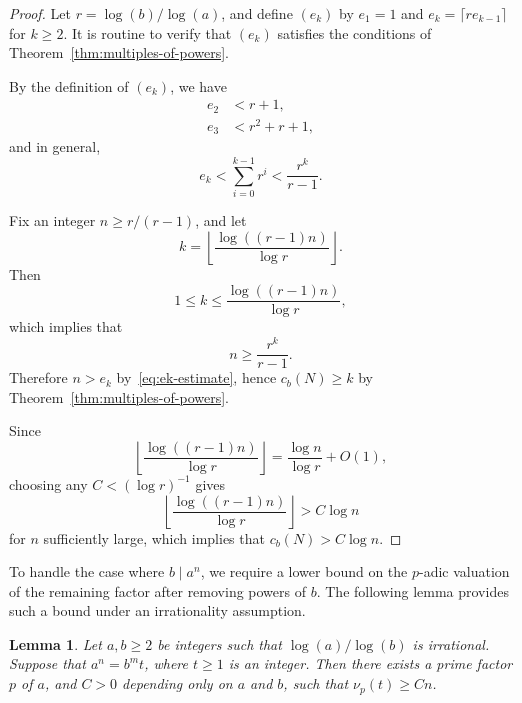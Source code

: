 \documentclass[12pt]{amsart}
\newtheorem{lemma}{Lemma}
\theoremstyle{remark}
\begin{document}
\begin{proof}
    Let $r = \log(b) / \log(a)$, and
    define $(e_k)$ by $e_1 = 1$ and $e_k = \lceil r e_{k-1} \rceil$
    for $k \ge 2$.
    It is routine to verify that $(e_k)$ satisfies the conditions of
    Theorem~\ref{thm:multiples-of-powers}.

    By the definition of $(e_k)$, we have
    \begin{align*}
        e_2 & < r + 1,             \\
        e_3 & < r^2 + r + 1,
    \end{align*}
    and in general,
    \begin{equation} \label{eq:ek-estimate}
        e_k < \sum_{i=0}^{k-1} r^{i}
        < \frac{r^k}{r - 1}.
    \end{equation}

    Fix an integer $n \ge r/(r-1)$, and let
    \[
        k = \left\lfloor \frac{\log((r-1)n)}{\log r} \right\rfloor.
    \]
    Then \[
        1 \le k \le \frac{\log((r-1) n)}{\log r},
    \]
    which implies that
    \[
        n \ge \frac{r^k}{r-1}.
    \]
    Therefore $n > e_k$ by~\eqref{eq:ek-estimate}, hence
    $c_b(N) \ge k$ by Theorem~\ref{thm:multiples-of-powers}.

    Since
    \[
        \left\lfloor \frac{\log((r-1)n)}{\log r} \right\rfloor
        = \frac{\log n}{\log r} + O(1),
    \]
    choosing any $C < (\log r)^{-1}$ gives
    \[
        \left\lfloor \frac{\log((r-1)n)}{\log r} \right\rfloor
        > C \log n
    \]
    for $n$ sufficiently large, which implies that $c_b(N) > C \log n$.
\end{proof}

To handle the case where $b \mid a^n$, we require a lower bound on the
$p$-adic valuation of the remaining factor after removing powers of $b$.
The following lemma provides such a bound under an irrationality assumption.

\begin{lemma} \label{lem:nu-p-estimate}
    Let $a, b \ge 2$ be integers such that $\log(a) / \log(b)$ is irrational.
    Suppose that $a^n = b^m t$, where $t \ge 1$ is an integer.
    Then there exists a prime factor $p$ of $a$, and $C > 0$ depending
    only on $a$ and $b$, such that $\nu_p(t) \ge Cn$.
\end{lemma}
\end{document}
